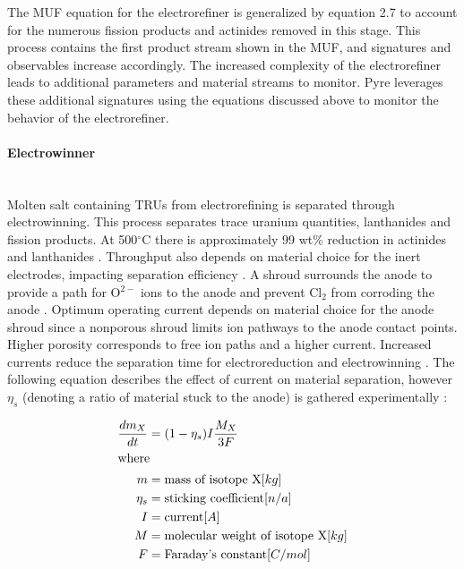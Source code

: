 The MUF equation for the electrorefiner is generalized by equation 2.7 to account for the numerous fission products and actinides removed in this stage. This process contains the first product stream shown in the MUF, and signatures and observables increase accordingly. The increased complexity of the electrorefiner leads to additional parameters and material streams to monitor. Pyre leverages these additional signatures using the equations discussed above to monitor the behavior of the electrorefiner.

\paragraph{Electrowinner} \mbox{}\\
Molten salt containing \glspl{TRU} from electrorefining is separated through electrowinning. This process separates trace uranium quantities, lanthanides and fission products. 
At 500$^{\circ}$C there is approximately 99 wt\% reduction in actinides and lanthanides \cite{flowsheet_1998}. 
Throughput also depends on material choice for the inert electrodes, impacting separation 
efficiency \cite{koyama_development_2012}. A shroud surrounds the anode to provide a path for O$^{2-}$ ions to the anode and 
prevent Cl$_2$ from corroding the anode \cite{kim_development_2013,choi_electrochemical_2015}. Optimum operating current 
depends on material choice for the anode shroud since a nonporous shroud limits ion pathways to the anode contact points.
Higher porosity corresponds to free ion paths and a higher current. Increased currents reduce the separation time for electroreduction and electrowinning \cite{choi_electrochemical_2015}.
The following equation describes the effect of current on material separation, however $\eta_s$ (denoting a ratio of material stuck to the anode) is gathered experimentally \cite{ahluwalia_uranium_2004}:

\begin{align}
\frac{dm_X}{dt} &= (1-\eta_s)I\frac{M_X}{3F} \\
\intertext{where}
m &= \mbox{mass of isotope X} [kg] \nonumber \\
\eta_s &= \mbox{sticking coefficient} [n/a] \nonumber \\
I &= \mbox{current} [A] \nonumber \\
M &= \mbox{molecular weight of isotope X} [kg] \nonumber \\
F &= \mbox{Faraday's constant} [C/mol] \nonumber
\end{align}

